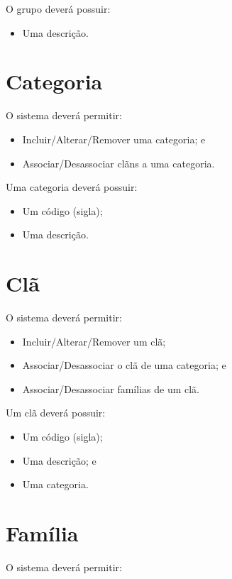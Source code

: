 O grupo deverá possuir:

\begin{itemize}
	\item Uma descrição.
\end{itemize}

\section{Categoria}

O sistema deverá permitir:

\begin{itemize}
	\item Incluir/Alterar/Remover uma categoria; e
	\item Associar/Desassociar clãns a uma categoria.
\end{itemize}

Uma categoria deverá possuir:

\begin{itemize}
	\item Um código (sigla);
	\item Uma descrição.
\end{itemize}

\section{Clã}

O sistema deverá permitir:

\begin{itemize}
	\item Incluir/Alterar/Remover um clã;
	\item Associar/Desassociar o clã de uma categoria; e
	\item Associar/Desassociar famílias de um clã.
\end{itemize}

Um clã deverá possuir:

\begin{itemize}
	\item Um código (sigla);
	\item Uma descrição; e
	\item Uma categoria.
\end{itemize}

\section{Família}

O sistema deverá permitir:

